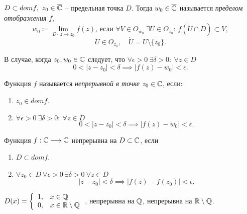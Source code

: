 \begin{definition}
    $ D \subset dom f, \ z_0 \in \overline{\mathbb{C}} $ -- предельная точка $ D $. Тогда $ w_0 \in \overline{\mathbb{C}} $ называется \emph{пределом отображения} $ f $,
    \[
        w_0 \coloneqq \underset{D \circ z \rightarrow z_0}{\lim}f(z) \text{, если }\forall V \in O_{w_0} \ \exists U \in O_{z_0}: \ f(\mathring{U}\cap D)\subset V,
    \]
    \[
        U \in O_{z_0}, \quad \mathring{U} = U\setminus\{z_0\}.
    \]
\end{definition}

\begin{note}
    В случае, когда $ z_0,w_0 \in\mathbb{C} $ следует, что $ \forall \epsilon > 0 \ \exists \delta > 0 : \ \forall z \in D $
    \[
        0 < | z - z_0 | < \delta \implies \big| f(z) - w_0 \big| < \epsilon.
    \]
\end{note}

\begin{definition}
    Функция $ f $ называется \emph{непрерывной в точке} $ z_0 \in \mathbb{C} $, если:
    \begin{enumerate}
        \item $ z_0 \in dom f $.
        \item $ \forall \epsilon > 0 \ \exists \delta > 0: \ \forall z \in D $
              \[
                  0 < | z - z_0 | < \delta \implies | f(z) - w_0 | < \epsilon.
              \]
    \end{enumerate}
\end{definition}

\newpage

\begin{definition}
    Функция $ f : \mathbb{C} \longrightarrow \mathbb{C} $ непрерывна на $ D \subset \mathbb{C} $, если
    \begin{enumerate}
        \item $ D \subset dom f $.
        \item $ \forall z_0 \in D \ \forall \epsilon > 0 \ \exists \delta > 0 \ \forall z \in D $
              \[
                  | z - z_0 | < \delta \implies \big|f(z) - f(z_0)\big| < \epsilon.
              \]
    \end{enumerate}
\end{definition}

\begin{note}
    $ D(x) = \left\{\begin{array}{ll}
            1, & x \in \mathbb{Q}              \\
            0, & x \in \mathbb{R} \setminus \mathbb{Q}
        \end{array}\right. $, непрерывна на $ \mathbb{Q} $, непрерывна на $ \mathbb{R} \setminus \mathbb{Q} $.
\end{note}

